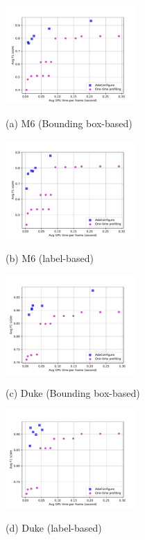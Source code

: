 \begin{figure}[!t]
	\begin{minipage}[t]{0.47\linewidth}
	\centerline{\includegraphics[width=5cm]{figures/m6.pdf}}
	\centerline{(a) M6 (Bounding box-based)}
	\end{minipage}
	\hfill
	\begin{minipage}[t]{0.47\linewidth}
	\centerline{\includegraphics[width=5cm]{figures/m6_label.pdf}}
	\centerline{(b) M6 (label-based)}
	\end{minipage}
	\vfill
	\begin{minipage}[t]{0.47\linewidth}
	\centerline{\includegraphics[width=5cm]{figures/duke.pdf}}
	\centerline{(c) Duke (Bounding box-based)}
	\end{minipage}
	\hfill
	\begin{minipage}[t]{0.47\linewidth}
	\centerline{\includegraphics[width=5cm]{figures/duke_label.pdf}}
	\centerline{(d) Duke (label-based)}

\end{minipage}
\end{figure}

